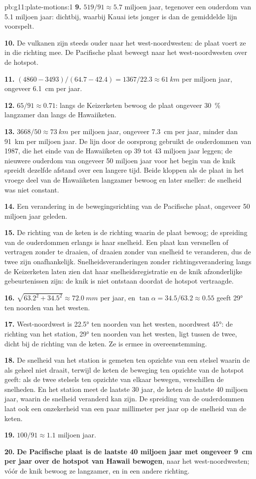 \begin{solution}{pb:g11:plate-motions:1}
\textbf{9.} $519/91 \approx 5.7$ miljoen jaar, tegenover een ouderdom van \num{5.1}
miljoen jaar: dichtbij, waarbij Kauai iets jonger is dan de gemiddelde lijn
voorspelt.

\textbf{10.} De vulkanen zijn steeds ouder naar het west-noordwesten:
de plaat voert ze in die richting mee. De Pacifische plaat beweegt naar het
west-noordwesten over de hotspot.

\textbf{11.} $(4860 - 3493)/(64.7 - 42.4) = 1367/22.3 \approx \qty{61}{km}$
per miljoen jaar, ongeveer \qty{6.1}{cm} per jaar.

\textbf{12.} $65/91 \approx 0.71$: langs de Keizerketen bewoog de plaat
ongeveer \qty{30}{\percent} langzamer dan langs de Hawaiiketen.

\textbf{13.} $3668/50 \approx \qty{73}{km}$ per miljoen jaar, ongeveer
\qty{7.3}{cm} per jaar, minder dan \qty{91}{km} per miljoen jaar. De lijn door de oorsprong
gebruikt de ouderdommen van 1987, die het einde van de Hawaiiketen op 39 tot 43
miljoen jaar leggen; de nieuwere ouderdom van ongeveer 50 miljoen jaar voor het begin
van de knik spreidt dezelfde afstand over een langere tijd. Beide kloppen als de plaat
in het vroege deel van de Hawaiiketen langzamer bewoog en later sneller:
de snelheid was niet constant.

\textbf{14.} Een verandering in de bewegingsrichting van de Pacifische plaat, ongeveer
50 miljoen jaar geleden.

\textbf{15.} De richting van de keten is de richting waarin de plaat
bewoog; de spreiding van de ouderdommen erlangs is haar snelheid. Een plaat kan
versnellen of vertragen zonder te draaien, of draaien zonder van snelheid te
veranderen, dus de twee zijn onafhankelijk. Snelheidsveranderingen zonder
richtingsverandering langs de Keizerketen laten zien dat haar snelheidsregistratie
en de knik afzonderlijke gebeurtenissen zijn: de knik is niet ontstaan doordat de
hotspot vertraagde.

\textbf{16.} $\sqrt{63.2^2 + 34.5^2} \approx \qty{72.0}{mm}$ per jaar, en
$\tan\alpha = 34.5/63.2 \approx 0.55$ geeft \ang{29} ten noorden van het westen.

\textbf{17.} West-noordwest is \ang{22.5} ten noorden van het westen, noordwest
\ang{45}: de richting van het station, \ang{29} ten noorden van het westen, ligt
tussen de twee, dicht bij de richting van de keten. Ze is ermee in overeenstemming.

\textbf{18.} De snelheid van het station is gemeten ten opzichte van een stelsel
waarin de  als geheel niet draait, terwijl de keten de beweging ten
opzichte van de hotspot geeft: als de twee stelsels ten opzichte van elkaar
bewegen, verschillen de snelheden. En het station meet de laatste 30 jaar,
de keten de laatste 40 miljoen jaar, waarin de snelheid veranderd kan zijn.
De spreiding van de ouderdommen laat ook een onzekerheid van een paar millimeter per
jaar op de snelheid van de keten.

\textbf{19.} $100/91 \approx 1.1$ miljoen jaar.

\textbf{20.} \textbf{De Pacifische plaat is de laatste 40 miljoen jaar met
ongeveer \qty{9}{cm} per jaar over de hotspot van Hawaii bewogen}, naar het
west-noordwesten; vóór de knik bewoog ze langzamer, en in een andere
richting.
\end{solution}

